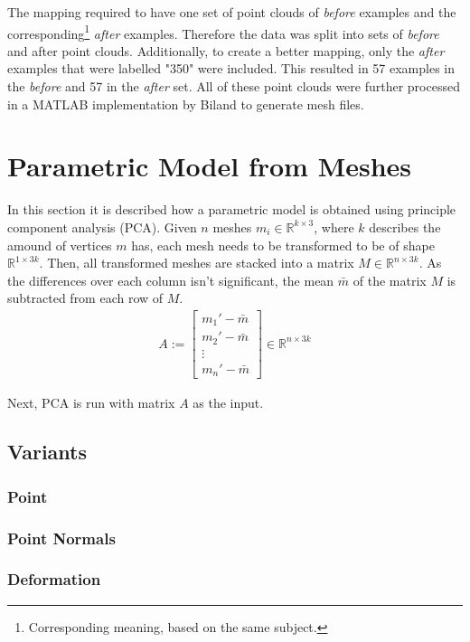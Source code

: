 The mapping required to have one set of point clouds of \textit{before} examples and the corresponding\footnote{Corresponding meaning, based on the same subject.} \textit{after} examples. Therefore the data was split into sets of \textit{before} and after point clouds. Additionally, to create a better mapping, only the \textit{after} examples that were labelled "350" were included. This resulted in 57 examples in the \textit{before} and 57 in the \textit{after} set. All of these point clouds were further processed in a MATLAB implementation by Biland \cite{Biland17} to generate mesh files.

\section{Parametric Model from Meshes}
In this section it is described how a parametric model is obtained using principle component analysis (PCA). Given $n$ meshes $m_i \in \mathbb{R}^{k \times 3}$, where $k$ describes the amound of vertices $m$ has, each mesh needs to be transformed to be of shape $\mathbb{R}^{1 \times 3k}$. Then, all transformed meshes are stacked into a matrix $M \in \mathbb{R}^{n \times 3k}$. As the differences over each column isn't significant, the mean $\bar{m}$ of the matrix $M$ is subtracted from each row of $M$.
\begin{gather}
A :=
\begin{bmatrix}
 m_1' - \bar{m} \\
 m_2' - \bar{m} \\
 \vdots \\
 m_n' - \bar{m}
\end{bmatrix}
 \in \mathbb{R}^{n \times 3k}
\end{gather}

Next, PCA is run with matrix $A$ as the input.

\subsection{Variants}
\subsubsection{Point}
\subsubsection{Point Normals}
\subsubsection{Deformation}

